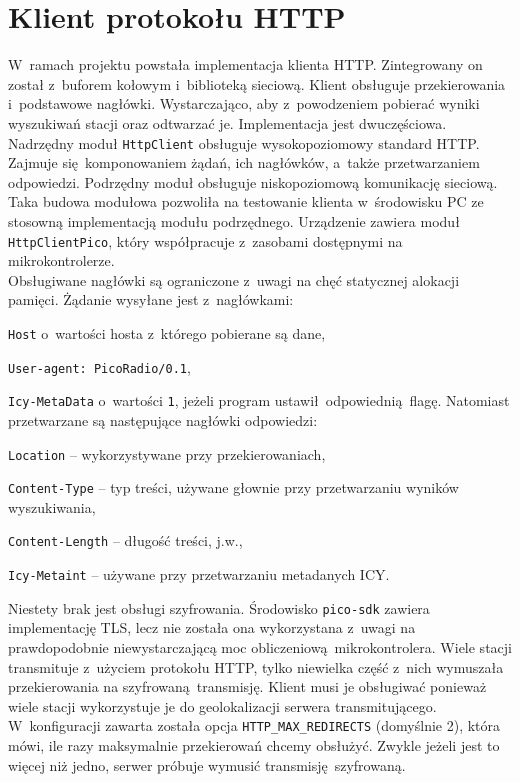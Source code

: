 \documentclass[polish]{aghengthesis}
\let\tempone\itemize
\let\temptwo\enditemize
\renewenvironment{itemize}{\tempone\setlength{\itemsep}{0cm}}{\temptwo}
\begin{document}
	\section{Klient protokołu HTTP}
		W~ramach projektu powstała implementacja klienta HTTP. Zintegrowany on został z~buforem kołowym i~biblioteką sieciową.
		Klient obsługuje przekierowania i~podstawowe nagłówki. Wystarczająco, aby z~powodzeniem pobierać wyniki wyszukiwań stacji oraz odtwarzać je. Implementacja jest dwuczęściowa. Nadrzędny moduł \lstinline|HttpClient| obsługuje wysokopoziomowy standard HTTP. Zajmuje się komponowaniem żądań, ich nagłówków, a~także przetwarzaniem odpowiedzi. Podrzędny moduł obsługuje niskopoziomową komunikację sieciową. Taka budowa modułowa pozwoliła na testowanie klienta w~środowisku PC ze stosowną implementacją modułu podrzędnego. Urządzenie zawiera moduł \lstinline|HttpClientPico|, który współpracuje z~zasobami dostępnymi na mikrokontrolerze.
		$ $\\
		
		Obsługiwane nagłówki są ograniczone z~uwagi na chęć statycznej alokacji pamięci. Żądanie wysyłane jest z~nagłówkami:
		\begin{itemize}
			\item \lstinline|Host| o~wartości hosta z~którego pobierane są dane,
			\item \lstinline|User-agent: PicoRadio/0.1|,
			\item \lstinline|Icy-MetaData| o~wartości \lstinline|1|, jeżeli program ustawił odpowiednią flagę.
		\end{itemize}
		Natomiast przetwarzane są następujące nagłówki odpowiedzi:
		\begin{itemize}
			\item \lstinline|Location| -- wykorzystywane przy przekierowaniach,
			\item \lstinline|Content-Type| -- typ treści, używane głownie przy przetwarzaniu wyników wyszukiwania,
			\item \lstinline|Content-Length| -- długość treści, j.w.,
			\item \lstinline|Icy-Metaint| -- używane przy przetwarzaniu metadanych ICY.
		\end{itemize}
		
		Niestety brak jest obsługi szyfrowania. Środowisko \lstinline|pico-sdk| zawiera implementację TLS, lecz nie została ona wykorzystana z~uwagi na prawdopodobnie niewystarczającą moc obliczeniową mikrokontrolera. Wiele stacji transmituje z~użyciem protokołu HTTP, tylko niewielka część z~nich wymuszała przekierowania na szyfrowaną transmisję. Klient musi je obsługiwać ponieważ wiele stacji wykorzystuje je do geolokalizacji serwera transmitującego. W~konfiguracji zawarta została opcja \lstinline|HTTP_MAX_REDIRECTS| (domyślnie 2), która mówi, ile razy maksymalnie przekierowań chcemy obsłużyć. Zwykle jeżeli jest to więcej niż jedno, serwer próbuje wymusić transmisję szyfrowaną.
		
\end{document}
